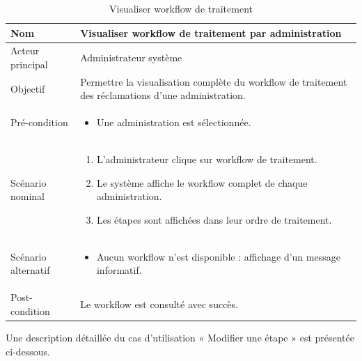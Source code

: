 \begin{table}[H]
\centering
\begin{tabular}{ |p{4cm}|p{12cm}|} \hline

Nom & Visualiser workflow de traitement par administration \\ \hline

Acteur principal & Administrateur système \\ \hline

Objectif & Permettre la visualisation complète du workflow de traitement des réclamations d’une administration. \\ \hline

Pré-condition &
\begin{itemize}
    \item Une administration est sélectionnée.
\end{itemize}
\\ \hline

Scénario nominal &
\begin{enumerate}
    \item L’administrateur clique sur workflow de traitement.
    \item Le système affiche le workflow complet de chaque administration.
    \item Les étapes sont affichées dans leur ordre de traitement.
\end{enumerate}
\\ \hline

Scénario alternatif &
\begin{itemize}
    \item Aucun workflow n’est disponible : affichage d’un message informatif.
\end{itemize}
\\ \hline

Post-condition &
Le workflow est consulté avec succès. \\ \hline

\end{tabular}
\caption{Visualiser workflow de traitement}
\end{table}


Une description détaillée du cas d’utilisation « Modifier une étape » est présentée ci-dessous.

